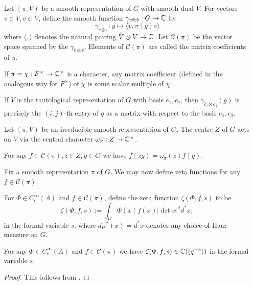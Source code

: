 \begin{defn}
Let $(\pi,V)$ be a smooth representation of $G$ with smooth dual $\check{V}$. For vectors $v\in V, \check{v} \in \check{V}$, define the smooth function $\gamma_{v \otimes \check{v}}: G \to \mathbb{C}$ by 
$$\gamma_{\check{v} \otimes v} : g \mapsto \langle \check{v},\pi(g) v \rangle$$ where $\langle, \rangle$ denotes the natural pairing $\check{V} \otimes V \to \mathbb{C}$. Let $\mathcal C(\pi)$ be the vector space spanned by the $\gamma_{\check{v} \otimes v}$. Elements of $\mathcal C(\pi)$ are called the matrix coefficients of $\pi$.
\end{defn}
\begin{rem}
    If $\pi=\chi:F^\times \to \mathbb{C}^\times$ is a character, any matrix coefficient (defined in the analogous way for $F^\times$) of $\chi$ is some scalar multiple of $\chi$.

    If $V$ is the tautological representation of $G$ with basis $e_1,e_2$, then $\gamma_{\check{e_i} \otimes e_j}(g)$ is precisely the $(i,j)$-th entry of $g$ as a matrix with respect to the basis $e_1,e_2$.
\end{rem}
\begin{defn}
    Let $(\pi,V)$ be an irreducible smooth representation of $G$. The centre $Z$ of $G$ acts on $V$ via the central character $\omega_\pi : Z \to \mathbb{C}^\times$.
\end{defn}
\begin{lemma}\label{central char}
    For any $f \in \mathcal C(\pi), z \in Z, g \in G$ we have $f(zg) = \omega_\pi(z) f(g)$.
\end{lemma}


Fix a smooth representation $\pi$ of $G$. We may now define zeta functions for any $f \in \mathcal C(\pi)$.

\begin{defn}
    For $\Phi \in C_c^\infty(A)$ and $f \in \mathcal C(\pi)$, define the zeta function $\zeta(\Phi,f,s)$ to be
    $$\zeta(\Phi,f,s) := \int_{G} \Phi(x)f(x)|\det x|^s d^*x,$$ in the formal variable $s$, where $d\mu^*(x) = d^*x$ denotes any choice of Haar measure on $G$.
\end{defn}

\begin{lemma}
    For any $\Phi \in C_c^\infty(A)$ and $f \in \mathcal C(\pi)$ we have $\zeta(\Phi,f,s) \in \mathbb{C}((q^{-s}))$ in the formal variable $s$.
\end{lemma}
\begin{proof}
    This follows from \cite[Lemma 24.4.1]{BH1}.
\end{proof}

